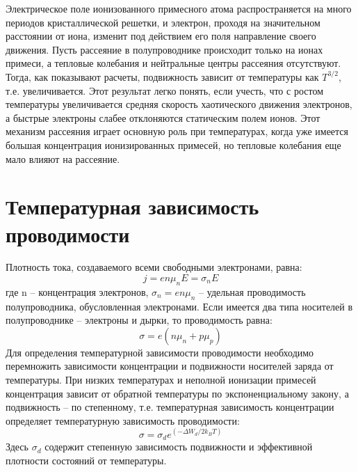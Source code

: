 Электрическое поле ионизованного примесного атома распространяется на много периодов кристаллической решетки, и
электрон, проходя на значительном расстоянии от иона, изменит под действием его поля направление своего движения. Пусть
рассеяние в полупроводнике происходит только на ионах примеси, а тепловые колебания и нейтральные центры рассеяния
отсутствуют. Тогда, как показывают расчеты, подвижность зависит от температуры как $T^{3/2}$, т.е. увеличивается. Этот
результат легко понять, если учесть, что с ростом температуры увеличивается средняя скорость хаотического движения
электронов, а быстрые электроны слабее отклоняются статическим полем ионов. Этот механизм рассеяния играет основную роль
при температурах, когда уже имеется большая концентрация ионизированных примесей, но тепловые колебания еще мало влияют
на рассеяние. 

\section{Температурная зависимость проводимости}
Плотность тока, создаваемого всеми свободными электронами, равна:
\begin{equation}
	j=e n \mu_{n} E=\sigma_{n} E
	\label{eq:4.1}
\end{equation}
где n – концентрация электронов, $\sigma_n = e n \mu_n$ – удельная проводимость полупроводника, обусловленная электронами.
Если имеется два типа носителей в полупроводнике – электроны и дырки,
то проводимость равна:
\begin{equation}
	\sigma=e\left(n \mu_{n}+p \mu_{p}\right)
	\label{eq:4.2}
\end{equation}
Для определения температурной зависимости проводимости необходимо перемножить зависимости концентрации и подвижности носителей заряда от
температуры. При низких температурах и неполной ионизации примесей концентрация зависит от обратной температуры по
экспоненциальному закону, а подвижность – по степенному, т.е. температурная зависимость концентрации определяет
температурную зависимость проводимости:
\begin{equation}
	\sigma=\sigma_{d} e^{\left(-\Delta W_{d} / 2 k_{B} T\right)}
	\label{eq:4.3}
\end{equation}
Здесь $\sigma_d$ содержит степенную зависимость подвижности и эффективной плотности состояний от температуры.

